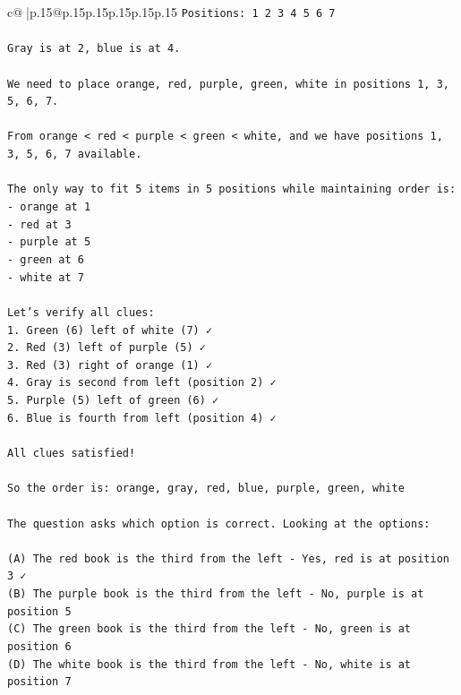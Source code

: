 \documentclass{article}
\begin{document}
{\begin{supertabular}{c@{$\;$}|p{.15\linewidth}@{}p{.15\linewidth}p{.15\linewidth}p{.15\linewidth}p{.15\linewidth}p{.15\linewidth}}
{{{\texttt{Positions: 1 2 3 4 5 6 7} \\
\\ 
\texttt{Gray is at 2, blue is at 4.} \\
\\ 
\texttt{We need to place orange, red, purple, green, white in positions 1, 3, 5, 6, 7.} \\
\\ 
\texttt{From orange < red < purple < green < white, and we have positions 1, 3, 5, 6, 7 available.} \\
\\ 
\texttt{The only way to fit 5 items in 5 positions while maintaining order is:} \\
\texttt{{-} orange at 1} \\
\texttt{{-} red at 3} \\
\texttt{{-} purple at 5} \\
\texttt{{-} green at 6} \\
\texttt{{-} white at 7} \\
\\ 
\texttt{Let's verify all clues:} \\
\texttt{1. Green (6) left of white (7) ✓} \\
\texttt{2. Red (3) left of purple (5) ✓} \\
\texttt{3. Red (3) right of orange (1) ✓} \\
\texttt{4. Gray is second from left (position 2) ✓} \\
\texttt{5. Purple (5) left of green (6) ✓} \\
\texttt{6. Blue is fourth from left (position 4) ✓} \\
\\ 
\texttt{All clues satisfied!} \\
\\ 
\texttt{So the order is: orange, gray, red, blue, purple, green, white} \\
\\ 
\texttt{The question asks which option is correct. Looking at the options:} \\
\\ 
\texttt{(A) The red book is the third from the left {-} Yes, red is at position 3 ✓} \\
\texttt{(B) The purple book is the third from the left {-} No, purple is at position 5} \\
\texttt{(C) The green book is the third from the left {-} No, green is at position 6} \\
\texttt{(D) The white book is the third from the left {-} No, white is at position 7} \\
}}}
\end{supertabular}}
\end{document}
